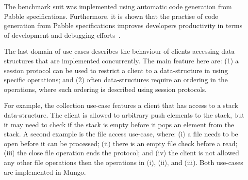 The benchmark suit was implemented using automatic code generation
from Pabble specifications. Furthermore, it is shown that the practise
of code generation from Pabble specifications improves developers
productivity in terms of development and debugging efforts~\cite{NCY2015}.

The last domain of use-cases describes the behaviour of
clients accessing data-structures that are implemented
concurrently. The main feature here are:
(1) a session protocol can be used to restrict
a client to a data-structure in using specific operations; and
(2) often data-structures require an ordering in the
operations, where such ordering is described using session protocols.

For example, the collection use-case features a client
that has access to a stack data-structure. The client
is allowed to arbitrary push elements to the stack, but
it may need to check if the stack is empty before it
pops an element from the stack.
A second example is the file access use-case, where:
(i) a file needs to be open before it can be processed;
(ii) there is an empty file check before a read;
(iii) the close file operation ends the protocol; and
(iv) the client is not allowed any other file operations then
the operations in (i), (ii), and (iii).
Both use-cases are implemented in Mungo.

